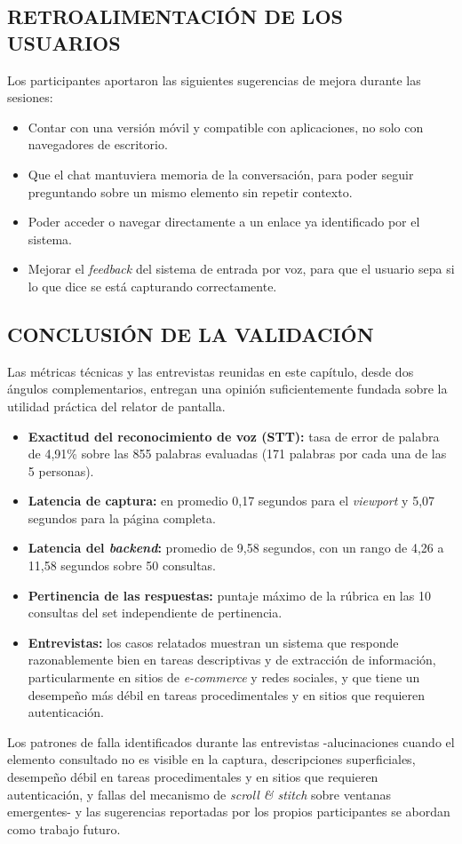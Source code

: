 \subsection{RETROALIMENTACIÓN DE LOS USUARIOS}

Los participantes aportaron las siguientes sugerencias de mejora durante las sesiones:

\begin{itemize}
    \item Contar con una versión móvil y compatible con aplicaciones, no solo con navegadores de escritorio.
    \item Que el chat mantuviera memoria de la conversación, para poder seguir preguntando sobre un mismo elemento sin repetir contexto.
    \item Poder acceder o navegar directamente a un enlace ya identificado por el sistema.
    \item Mejorar el \textit{feedback} del sistema de entrada por voz, para que el usuario sepa si lo que dice se está capturando correctamente.
\end{itemize}

\subsection{CONCLUSIÓN DE LA VALIDACIÓN}

Las métricas técnicas y las entrevistas reunidas en este capítulo, desde dos ángulos complementarios, entregan una opinión suficientemente fundada sobre la utilidad práctica del relator de pantalla.

\begin{itemize}
    \item \textbf{Exactitud del reconocimiento de voz (STT):} tasa de error de palabra de 4,91\% sobre las 855 palabras evaluadas (171 palabras por cada una de las 5 personas).
    \item \textbf{Latencia de captura:} en promedio 0,17 segundos para el \textit{viewport} y 5,07 segundos para la página completa.
    \item \textbf{Latencia del \textit{backend}:} promedio de 9,58 segundos, con un rango de 4,26 a 11,58 segundos sobre 50 consultas.
    \item \textbf{Pertinencia de las respuestas:} puntaje máximo de la rúbrica en las 10 consultas del set independiente de pertinencia.
    \item \textbf{Entrevistas:} los casos relatados muestran un sistema que responde razonablemente bien en tareas descriptivas y de extracción de información, particularmente en sitios de \textit{e-commerce} y redes sociales, y que tiene un desempeño más débil en tareas procedimentales y en sitios que requieren autenticación.
\end{itemize}

Los patrones de falla identificados durante las entrevistas -alucinaciones cuando el elemento consultado no es visible en la captura, descripciones superficiales, desempeño débil en tareas procedimentales y en sitios que requieren autenticación, y fallas del mecanismo de \textit{scroll \& stitch} sobre ventanas emergentes- y las sugerencias reportadas por los propios participantes se abordan como trabajo futuro.